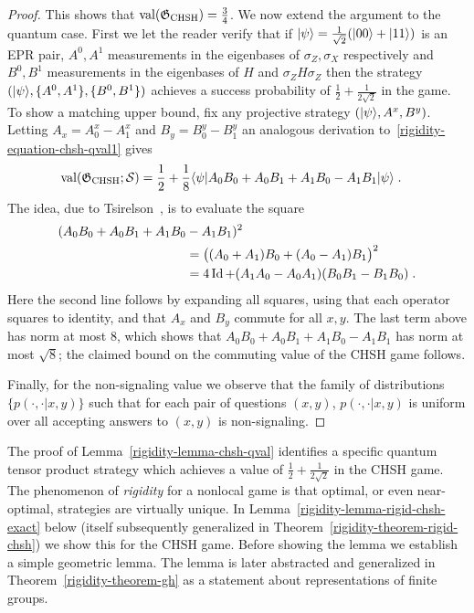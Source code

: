 \begin{proof}
This shows that $\mathrm{val}(\mathfrak{G}_{\mathrm{CHSH}})=\frac{3}{4}$. We now extend the argument to the quantum case. First we let the reader verify that if $|\psi\rangle = \frac{1}{\sqrt{2}} (|00\rangle + |11\rangle)$ is an EPR pair, $A^0, A^1$ measurements in the eigenbases of $\sigma_Z,\sigma_X$ respectively and $B^0,B^1$ measurements in the eigenbases of $H$ and $\sigma_Z H \sigma_Z$ then the strategy $(|\psi\rangle,\{A^0,A^1\},\{B^0,B^1\})$ achieves a success probability of $\frac{1}{2}+\frac{1}{2\sqrt{2}}$ in the game. To show a matching upper bound, fix any projective strategy $(|\psi\rangle, A^x,B^y)$. Letting $A_x = A^x_0-A^x_1$ and  $B_y = B^y_0-B^y_1$ an analogous derivation to~\eqref{rigidity-equation-chsh-qval1} gives 
\begin{align*}
\mathrm{val}(\mathfrak{G}_{\mathrm{CHSH}};\mathcal{S}) &=\frac{1}{2} + \frac{1}{8}\langle\psi| A_0 B_0 + A_0 B_1 + A_1 B_0 - A_1 B_1 |\psi\rangle\;.
\end{align*}
The idea, due to Tsirelson~\cite{cirel1980quantum}, is to evaluate the square
\begin{align}
(A_0 B_0 + A_0 B_1 + A_1 B_0 &- A_1 B_1 )^2\label{equation-bellop}\\
 &=\big( (A_0+A_1) B_0 + (A_0-A_1) B_1 \big)^2\notag\\
&= 4\mathop{\rm Id}\nolimits + (A_1A_0-A_0A_1) (B_0B_1-B_1B_0)\;.\notag
\end{align}
Here the second line follows by expanding all squares, using that each operator squares to identity, and that $A_x$ and $B_y$ commute for all $x,y$. The last term above has norm at most $8$, which shows that $A_0 B_0 + A_0 B_1 + A_1 B_0 - A_1 B_1 $ has norm at most $\sqrt{8}$; the claimed bound on the commuting value of the CHSH game  follows. 

Finally, for the non-signaling value we observe that the family of distributions $\{p(\cdot,\cdot|x,y)\}$ such that for each pair of questions $(x,y)$, $p(\cdot,\cdot|x,y)$ is uniform over all accepting answers to $(x,y)$ is non-signaling. 
\end{proof}


The proof of Lemma~\ref{rigidity-lemma-chsh-qval} identifies a specific quantum tensor product strategy which achieves a value of $\frac{1}{2} + \frac{1}{2\sqrt{2}}$ in the CHSH game. The phenomenon of \emph{rigidity} for a nonlocal game is that optimal, or even near-optimal, strategies are virtually unique. In Lemma~\ref{rigidity-lemma-rigid-chsh-exact} below (itself subsequently generalized in Theorem~\ref{rigidity-theorem-rigid-chsh}) we show this for the CHSH game. Before showing the lemma we establish a simple geometric lemma. The lemma is later abstracted and generalized  in Theorem~\ref{rigidity-theorem-gh} as a statement about representations of finite groups. 

